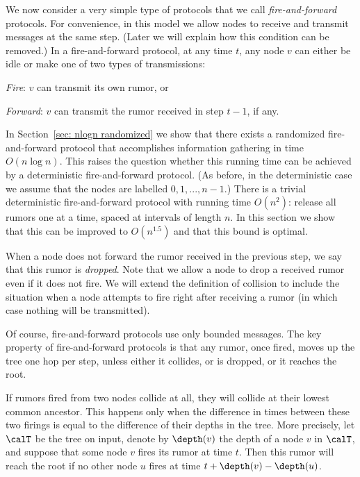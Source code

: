





We now consider a very simple type of protocols that we call \emph{fire-and-forward} protocols.
For convenience, in this model we allow nodes to receive and transmit messages at the same step. 
(Later we will explain how this condition can be removed.) In 
a fire-and-forward protocol, at any time $t$, any node $v$ can either be idle or
make one of two types of transmissions:
\begin{description}
\item{\emph{Fire}:} $v$ can transmit its own rumor, or
	\item{\emph{Forward}:} $v$ can transmit the rumor received in step $t-1$, if any.
\end{description} 
In Section~\ref{sec: nlogn randomized} we show that there exists a randomized
fire-and-forward protocol that accomplishes information gathering in time $O(n\log n)$.
This raises the question whether this running time can be achieved by a
deterministic fire-and-forward protocol. 
(As before, in the deterministic case we assume that the nodes are labelled $0,1,...,n-1$.)
There is a trivial deterministic fire-and-forward protocol with running time $O(n^2)$: release
all rumors one at a time, spaced at intervals of length $n$. In this section we show that
this can be improved to $O(n^{1.5})$ and that this bound is optimal.

When a node does not forward the rumor received in the previous step, we say that
this rumor is \emph{dropped}. Note that we allow a node to drop a received rumor even
if it does not fire. We will extend the definition of collision to include the
situation when a node attempts to fire right after receiving a rumor (in which case
nothing will be transmitted).

Of course, fire-and-forward protocols use only bounded messages. The key property of
fire-and-forward protocols is that any rumor, once fired,
moves up the tree one hop per step, unless either it collides, or is dropped,
or it reaches the root. 

If rumors fired from two nodes collide at all, they will collide at
their lowest common ancestor. This happens only when the
difference in times between these two firings is equal to the difference
of their depths in the tree. More precisely, let $\calT$ be the tree on input,
denote by $\depth(v)$ the depth of a node $v$ in $\calT$, and suppose that some node
$v$ fires its rumor at time $t$. Then this rumor will reach the root if
no other node $u$ fires at time $t+\depth(v) - \depth(u)$.


